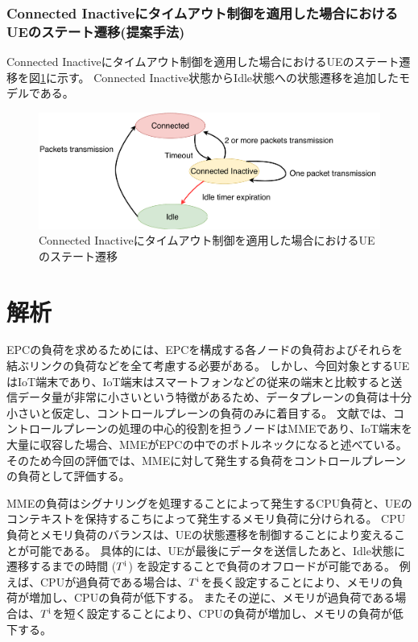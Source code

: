 \documentclass[a4j]{ujarticle}
\begin{document}
    \subsubsection{Connected Inactiveにタイムアウト制御を適用した場合におけるUEのステート遷移(提案手法)}
    Connected Inactiveにタイムアウト制御を適用した場合におけるUEのステート遷移を図\ref{state_change_propose}に示す。
    Connected Inactive状態からIdle状態への状態遷移を追加したモデルである。
    \begin{figure}[htbp]
      \centering
      \includegraphics[width=1.0\hsize]{state_change_propose.pdf}
      \caption{Connected Inactiveにタイムアウト制御を適用した場合におけるUEのステート遷移}
      \label{state_change_propose}
    \end{figure}

\section{解析}
\label{seq:estimate}
EPCの負荷を求めるためには、EPCを構成する各ノードの負荷およびそれらを結ぶリンクの負荷などを全て考慮する必要がある。
しかし、今回対象とするUEはIoT端末であり、IoT端末はスマートフォンなどの従来の端末と比較すると送信データ量が非常に小さいという特徴があるため、データプレーンの負荷は十分小さいと仮定し、コントロールプレーンの負荷のみに着目する。
文献\cite{ACloudNativeSolutionforDynamicAutoScalingofMMEinLTE}では、コントロールプレーンの処理の中心的役割を担うノードはMMEであり、IoT端末を大量に収容した場合、MMEがEPCの中でのボトルネックになると述べている。
そのため今回の評価では、MMEに対して発生する負荷をコントロールプレーンの負荷として評価する。

MMEの負荷はシグナリングを処理することによって発生するCPU負荷と、UEのコンテキストを保持するこちによって発生するメモリ負荷に分けられる。
CPU負荷とメモリ負荷のバランスは、UEの状態遷移を制御することにより変えることが可能である。
具体的には、UEが最後にデータを送信したあと、Idle状態に遷移するまでの時間 ($T^{\rm i}$) を設定することで負荷のオフロードが可能である。
例えば、CPUが過負荷である場合は、$T^{\rm i}$を長く設定することにより、メモリの負荷が増加し、CPUの負荷が低下する。
またその逆に、メモリが過負荷である場合は、$T^{\rm i}$を短く設定することにより、CPUの負荷が増加し、メモリの負荷が低下する。
\end{document}
